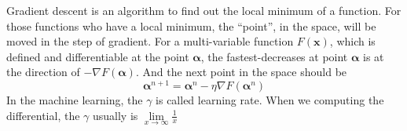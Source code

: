 \documentclass{article}
\begin{document}
Gradient descent is an algorithm to find out the local minimum of a function. For those functions who have a local minimum,
the ``point'', in the space, will be moved in the step of gradient.
For a multi-variable function $F(\mathbf{x})$, which is defined and differentiable at the point $\mathbf{\alpha}$, 
the fastest-decreases at point $\mathbf{\alpha}$ is at the direction of $-\nabla F(\mathbf{\alpha})$.
And the next point in the space should be
\begin{equation}
	\label{eq:gd:next}
	\mathbf{\alpha}^{n+1} = \mathbf{\alpha}^n - \eta\nabla F(\mathbf{\alpha}^n)
\end{equation}
In the machine learning, the $\gamma$ is called learning rate. When we computing the differential, the $\gamma$ usually is $\lim\limits_{x \rightarrow \infty} \frac{1}{x}$







\printbibliography
\end{document}
